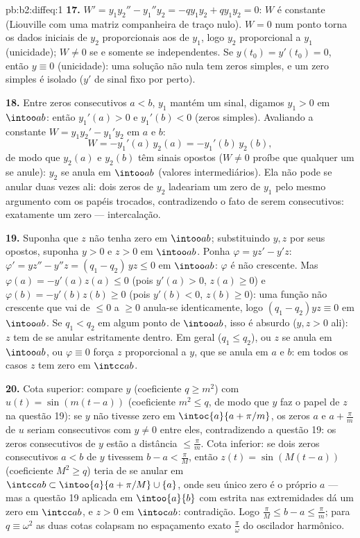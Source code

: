 \begin{solution}{pb:b2:diffeq:1}
\textbf{17.} $W' = y_1y_2'' - y_1''y_2 = -qy_1y_2 + qy_1y_2 =
0$: $W$ é constante (Liouville com uma matriz companheira de
traço nulo). $W = 0$ num ponto torna os dados iniciais de $y_2$
proporcionais aos de $y_1$, logo $y_2$ proporcional a
$y_1$ (unicidade); $W \neq 0$ se e somente se independentes. Se $y(t_0) =
y'(t_0) = 0$, então $y \equiv 0$ (unicidade): uma solução não nula
tem zeros simples, e um zero simples é isolado
($y'$ de sinal fixo por perto).

\textbf{18.} Entre zeros consecutivos $a < b$, $y_1$ mantém
um sinal, digamos $y_1 > 0$ em $\intoo ab$: então $y_1'(a) > 0$ e
$y_1'(b) < 0$ (zeros simples). Avaliando a constante $W =
y_1y_2' - y_1'y_2$ em $a$ e $b$:
\[
W = -y_1'(a)\,y_2(a) = -y_1'(b)\,y_2(b) ,
\]
de modo que $y_2(a)$ e $y_2(b)$ têm sinais opostos ($W \neq 0$
proíbe que qualquer um se anule): $y_2$ se anula em $\intoo ab$
(valores intermediários). Ela não pode se anular duas vezes ali: dois zeros
de $y_2$ ladeariam um zero de $y_1$ pelo mesmo argumento com
os papéis trocados, contradizendo o fato de serem consecutivos: exatamente
um zero --- intercalação.

\textbf{19.} Suponha que $z$ não tenha zero em $\intoo ab$; substituindo
$y, z$ por seus opostos, suponha $y > 0$ e $z > 0$ em
$\intoo ab$. Ponha $\varphi = yz' - y'z$: $\varphi' = yz'' -
y''z = (q_1 - q_2)\,yz \leq 0$ em $\intoo ab$: $\varphi$ é
não crescente. Mas $\varphi(a) = -y'(a)z(a) \leq 0$ (pois
$y'(a) > 0$, $z(a) \geq 0$) e $\varphi(b) = -y'(b)z(b) \geq
0$ (pois $y'(b) < 0$, $z(b) \geq 0$): uma função não crescente
que vai de $\leq 0$ a $\geq 0$ anula-se identicamente, logo
$(q_1 - q_2)yz \equiv 0$ em $\intoo ab$. Se $q_1 < q_2$
em algum ponto de $\intoo ab$, isso é absurdo ($y, z > 0$ ali):
$z$ tem de se anular estritamente dentro. Em geral ($q_1 \leq q_2$),
ou $z$ se anula em $\intoo ab$, ou $\varphi \equiv 0$
força $z$ proporcional a $y$, que se anula em $a$ e $b$:
em todos os casos $z$ tem zero em $\intcc ab$.

\textbf{20.} Cota superior: compare $y$ (coeficiente $q \geq
m^2$) com $u(t) = \sin(m(t - a))$ (coeficiente $m^2 \leq q$,
de modo que $y$ faz o papel de $z$ na questão 19): se $y$ não tivesse
zero em $\intoc{a}{a + \pi/m}$, os zeros $a$ e $a +
\frac\pi m$ de $u$ seriam consecutivos com $y \neq 0$
entre eles, contradizendo a questão 19: os zeros consecutivos de
$y$ estão a distância $\leq \frac\pi m$. Cota inferior: se dois
zeros consecutivos $a < b$ de $y$ tivessem $b - a < \frac\pi M$,
então $z(t) = \sin(M(t-a))$ (coeficiente $M^2 \geq q$) teria de
se anular em $\intcc ab \subset \intoo{a}{a + \pi/M}
\cup\{a\}$, onde seu único zero é o próprio $a$ --- mas a
questão 19 aplicada em $\intoo{a}{b}$ com estrita nas
extremidades dá um zero em $\intcc ab$, e $z > 0$ em
$\intoc ab$: contradição. Logo $\frac\pi M \leq b - a \leq
\frac\pi m$; para $q \equiv \omega^2$ as duas cotas colapsam no
espaçamento exato $\frac\pi\omega$ do oscilador
harmônico.


\end{solution}
